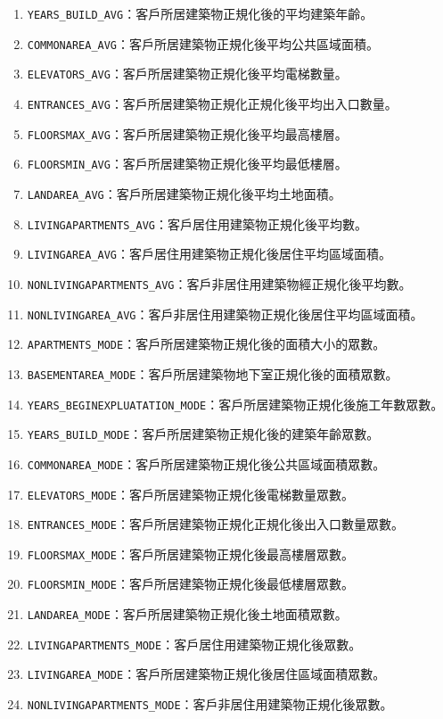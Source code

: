 \documentclass[12pt, a4paper]{article}
\begin{document}
\begin{enumerate}
\item \verb|YEARS_BUILD_AVG|：客戶所居建築物正規化後的平均建築年齡。
\item \verb|COMMONAREA_AVG|：客戶所居建築物正規化後平均公共區域面積。
\item \verb|ELEVATORS_AVG|：客戶所居建築物正規化後平均電梯數量。
\item \verb|ENTRANCES_AVG|：客戶所居建築物正規化正規化後平均出入口數量。
\item \verb|FLOORSMAX_AVG|：客戶所居建築物正規化後平均最高樓層。
\item \verb|FLOORSMIN_AVG|：客戶所居建築物正規化後平均最低樓層。
\item \verb|LANDAREA_AVG|：客戶所居建築物正規化後平均土地面積。
\item \verb|LIVINGAPARTMENTS_AVG|：客戶居住用建築物正規化後平均數。
\item \verb|LIVINGAREA_AVG|：客戶居住用建築物正規化後居住平均區域面積。
\item \verb|NONLIVINGAPARTMENTS_AVG|：客戶非居住用建築物經正規化後平均數。
\item \verb|NONLIVINGAREA_AVG|：客戶非居住用建築物正規化後居住平均區域面積。
\item \verb|APARTMENTS_MODE|：客戶所居建築物正規化後的面積大小的眾數。
\item \verb|BASEMENTAREA_MODE|：客戶所居建築物地下室正規化後的面積眾數。
\item \verb|YEARS_BEGINEXPLUATATION_MODE|：客戶所居建築物正規化後施工年數眾數。
\item \verb|YEARS_BUILD_MODE|：客戶所居建築物正規化後的建築年齡眾數。
\item \verb|COMMONAREA_MODE|：客戶所居建築物正規化後公共區域面積眾數。
\item \verb|ELEVATORS_MODE|：客戶所居建築物正規化後電梯數量眾數。
\item \verb|ENTRANCES_MODE|：客戶所居建築物正規化正規化後出入口數量眾數。
\item \verb|FLOORSMAX_MODE|：客戶所居建築物正規化後最高樓層眾數。
\item \verb|FLOORSMIN_MODE|：客戶所居建築物正規化後最低樓層眾數。
\item \verb|LANDAREA_MODE|：客戶所居建築物正規化後土地面積眾數。
\item \verb|LIVINGAPARTMENTS_MODE|：客戶居住用建築物正規化後眾數。
\item \verb|LIVINGAREA_MODE|：客戶所居建築物正規化後居住區域面積眾數。
\item \verb|NONLIVINGAPARTMENTS_MODE|：客戶非居住用建築物正規化後眾數。

\end{enumerate}
\end{document}
